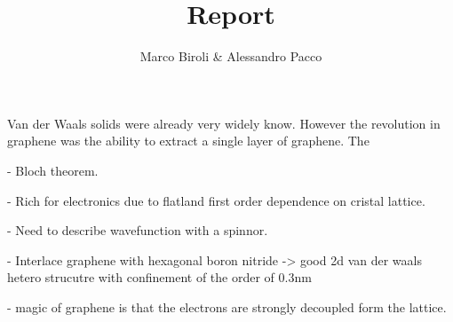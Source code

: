 \documentclass[10pt,a4paper]{article}
\author{Marco Biroli \& Alessandro Pacco}
\title{Report}
\begin{document}
\maketitle

Van der Waals solids were already very widely know. However the revolution in graphene was the ability to extract a single layer of graphene. The 

- Bloch theorem.

- Rich for electronics due to flatland first order dependence on cristal lattice.

- Need to describe wavefunction with a spinnor.

- Interlace graphene with hexagonal boron nitride -> good 2d van der waals hetero strucutre with confinement of the order of 0.3nm

- magic of graphene is that the electrons are strongly decoupled form the lattice.
\end{document}
